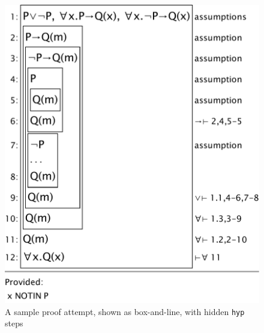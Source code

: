 \begin{figure}
\begin{center}
\includegraphics[scale=0.5]{pics/sampleboxNlinehiddenhyp}
\caption{A sample proof attempt, shown as box-and-line, with hidden \texttt{hyp} steps}
\label{fig:sampleboxNlinehiddenhyp}
\end{center}
\end{figure}

